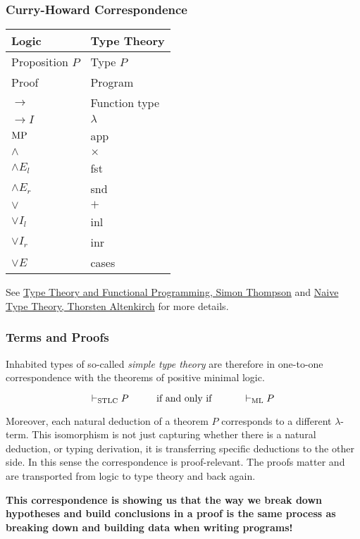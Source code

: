 \documentclass{beamer}
\theoremstyle{indentDefn} \newtheorem{defn}[]{Definition}
\begin{document}
\begin{frame}
  \frametitle{Curry-Howard Correspondence}

  \begin{center}
    \begin{tabular}{l|l}
      Logic & Type Theory \\
      \hline
      Proposition $P$ & Type $P$ \\
      Proof & Program \\
      $\to$ & Function type \\
      $\to I$ & $\lambda$ \\
      $\text{MP}$ & app \\
      $\land$ & $\times$ \\
      $\land E_{l}$ & fst \\
      $\land E_{r}$ & snd \\
      $\lor$ & $+$\\ 
      $\lor I_{l}$ & inl \\
      $\lor I_{r}$ & inr \\
      $\lor E$ & cases  
    \end{tabular}
  \end{center}
  
  See \href{https://www.cs.kent.ac.uk/people/staff/sjt/TTFP/}{Type Theory and Functional Programming, Simon Thompson} and \href{https://people.cs.nott.ac.uk/psztxa/publ/fomus19.pdf}{Naive Type Theory, Thorsten Altenkirch} for more details.
\end{frame}

\begin{frame}
  \frametitle{Terms and Proofs}

  Inhabited types of so-called \emph{simple type theory} are therefore in one-to-one correspondence with the theorems of positive minimal logic. 

  $$ \vdash_{\text{STLC}} P \hspace{1cm} \text{if and only if } \hspace{10mm} \vdash_{\text{ML}} P$$
  
  Moreover, each natural deduction of a theorem $P$ corresponds to a different $\lambda$-term. This isomorphism is not just capturing whether there is a natural deduction, or typing derivation, it is transferring specific deductions to the other side. In this sense the correspondence is proof-relevant. The proofs matter and are transported from logic to type theory and back again.
  
  \textbf{This correspondence is showing us that the way we break down hypotheses and build conclusions in a proof is the same process as breaking down and building data when writing programs!}

\end{frame}
\end{document}
